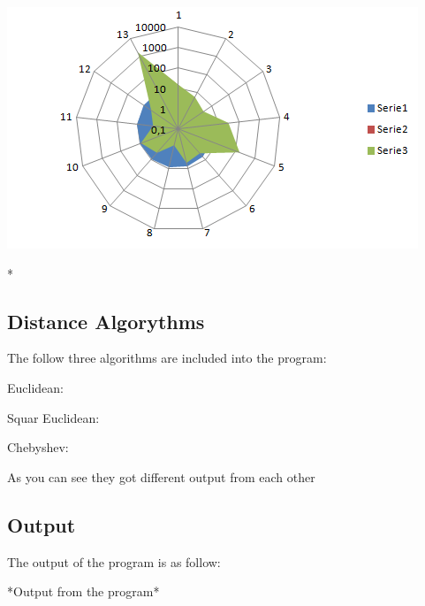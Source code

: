 \documentclass[a4paper,12pt,pdftex]{article}
\begin{document}
\includegraphics{radar2.png}

*

\subsection{Distance Algorythms}

The follow three algorithms are included into the program:

Euclidean:

Squar Euclidean:

Chebyshev:

As you can see they got different output from each other
\subsection{Output}

The output of the program is as follow:

*Output from the program*

\nocite{*}



\end{document}

